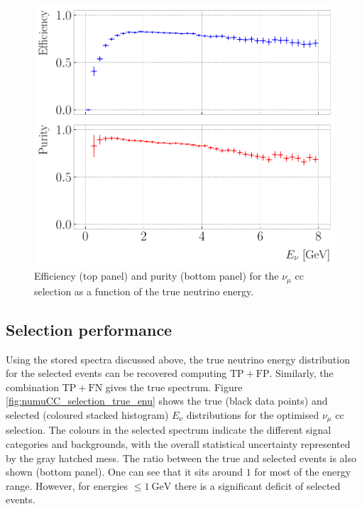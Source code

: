 \begin{figure}[t]
	\centering
	\includegraphics[width=.70\linewidth]{Images/GAr_selection/numuCC_selection_true_energy_performance.pdf}
	\caption[Efficiency and purity for the $\nu_{\mu}$ \gls{cc} selection as a function of the true neutrino energy.]{Efficiency (top panel) and purity (bottom panel) for the $\nu_{\mu}$ \gls{cc} selection as a function of the true neutrino energy.}
	\label{fig:numuCC_selection_true_enu_performance}
\end{figure}

\subsection{Selection performance}

Using the stored spectra discussed above, the true neutrino energy distribution for the selected events can be recovered computing $\mathrm{TP}+\mathrm{FP}$. Similarly, the combination $\mathrm{TP}+\mathrm{FN}$ gives the true spectrum. Figure \ref{fig:numuCC_selection_true_enu} shows the true (black data points) and selected (coloured stacked histogram) $E_{\nu}$ distributions for the optimised $\nu_{\mu}$ \gls{cc} selection. The colours in the selected spectrum indicate the different signal categories and backgrounds, with the overall statistical uncertainty represented by the gray hatched mess. The ratio between the true and selected events is also shown (bottom panel). One can see that it sits around $1$ for most of the energy range. However, for energies $\leq 1~\mathrm{GeV}$ there is a significant deficit of selected events.

